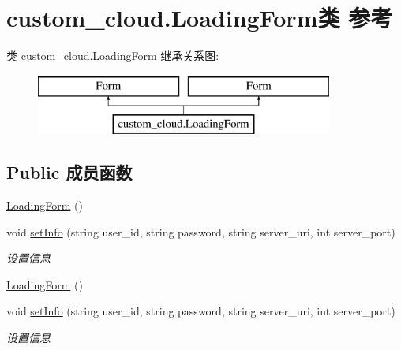 \hypertarget{classcustom__cloud_1_1_loading_form}{}\section{custom\+\_\+cloud.\+Loading\+Form类 参考}
\label{classcustom__cloud_1_1_loading_form}
类 custom\+\_\+cloud.\+Loading\+Form 继承关系图\+:\begin{figure}[H]
\begin{center}
\leavevmode
\includegraphics[height=2.000000cm]{classcustom__cloud_1_1_loading_form}
\end{center}
\end{figure}
\subsection*{Public 成员函数}
\begin{DoxyCompactItemize}
\item 
\hyperlink{classcustom__cloud_1_1_loading_form_a5610d280cbd01e6c2cb528775082e7e6}{Loading\+Form} ()
\item 
void \hyperlink{classcustom__cloud_1_1_loading_form_a71b1980aedb2a407f02863972b7ca19b}{set\+Info} (string user\+\_\+id, string password, string server\+\_\+uri, int server\+\_\+port)
\begin{DoxyCompactList}\small\item\em 设置信息 \end{DoxyCompactList}\item 
\hyperlink{classcustom__cloud_1_1_loading_form_a5610d280cbd01e6c2cb528775082e7e6}{Loading\+Form} ()
\item 
void \hyperlink{classcustom__cloud_1_1_loading_form_a71b1980aedb2a407f02863972b7ca19b}{set\+Info} (string user\+\_\+id, string password, string server\+\_\+uri, int server\+\_\+port)
\begin{DoxyCompactList}\small\item\em 设置信息 \end{DoxyCompactList}\end{DoxyCompactItemize}
